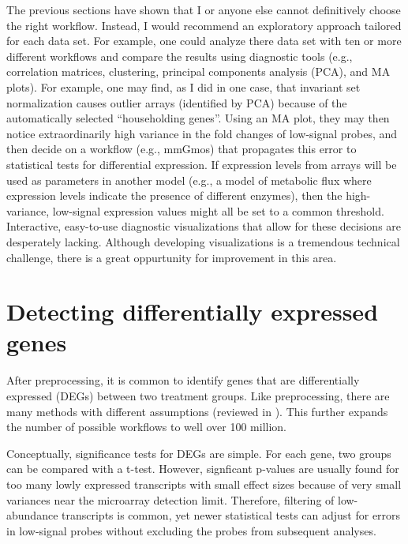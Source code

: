 The previous sections have shown that I or anyone
else cannot definitively choose the right workflow. 
Instead, I would recommend an exploratory approach 
tailored for each data set.
For example, one could analyze there data set with ten 
or more different workflows and compare the results
using diagnostic tools (e.g., correlation matrices, clustering,
principal components analysis (PCA), and MA plots).
For example, one may find, as I did in one case, that invariant set
normalization causes outlier arrays (identified by PCA) because
of the automatically selected ``householding genes''.
Using an MA plot, they may then notice extraordinarily
high variance in the fold changes of low-signal probes, and then decide
on a workflow (e.g., mmGmos) that propagates this error to
statistical tests for differential expression. If expression levels
from arrays will be used as parameters in another model (e.g., a model
of metabolic flux where expression levels indicate the presence of 
different enzymes), then the high-variance, low-signal expression values
might all be set to a common threshold.
Interactive, easy-to-use diagnostic visualizations that allow for these
decisions are desperately lacking.
Although developing visualizations is a tremendous technical challenge,
there is a great oppurtunity for improvement in this area.

\section[Differential expression]{Detecting differentially expressed genes}

After preprocessing, it is common to identify genes that are differentially
expressed (DEGs) between two treatment groups. Like preprocessing,
there are many methods with different assumptions (reviewed in
\cite{Cui:2003vl,Murie:2009dk,Storey:2003kd,Sreekumar:2008wj,
Pan:2002hy,Hong:2008hy,Yanofsky:2010by,Kadota:2011dz,Jeffery:2006bm}). This further expands
the number of possible workflows to well over 100 million.

Conceptually, significance tests for DEGs are simple.
For each gene, two groups can be compared with a t-test.
However, signficant p-values are usually found for too many 
lowly expressed transcripts with small effect sizes because of very small
variances near the microarray detection limit.
Therefore, filtering of low-abundance transcripts is common, 
yet newer statistical tests can adjust for errors in low-signal probes
without excluding the probes from subsequent analyses.

